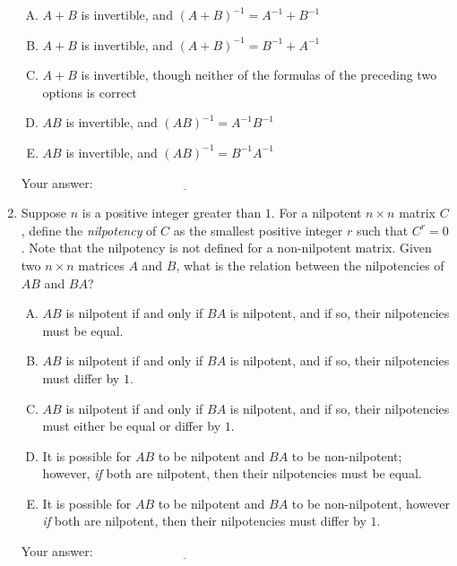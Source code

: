 \documentclass[10pt]{amsart}
\begin{document}
\begin{enumerate}
  \begin{enumerate}[(A)]
  \item $A + B$ is invertible, and $(A + B)^{-1} = A^{-1} + B^{-1}$
  \item $A + B$ is invertible, and $(A + B)^{-1} = B^{-1} + A^{-1}$
  \item $A + B$ is invertible, though neither of the formulas of the
    preceding two options is correct
  \item $AB$ is invertible, and $(AB)^{-1} = A^{-1}B^{-1}$
  \item $AB$ is invertible, and $(AB)^{-1} = B^{-1}A^{-1}$
  \end{enumerate}

  \vspace{0.1in}
  Your answer: $\underline{\qquad\qquad\qquad\qquad\qquad\qquad\qquad}$
  \vspace{0.1in}

\item Suppose $n$ is a positive integer greater than $1$. For a
  nilpotent $n \times n$ matrix $C$, define the {\em nilpotency} of
  $C$ as the smallest positive integer $r$ such that $C^r = 0$. Note
  that the nilpotency is not defined for a non-nilpotent matrix. Given
  two $n \times n$ matrices $A$ and $B$, what is the relation between
  the nilpotencies of $AB$ and $BA$?

  \begin{enumerate}[(A)]
  \item $AB$ is nilpotent if and only if $BA$ is nilpotent, and if
    so, their nilpotencies must be equal.
  \item $AB$ is nilpotent if and only if $BA$ is nilpotent, and if so,
    their nilpotencies must differ by $1$.
  \item $AB$ is nilpotent if and only if $BA$ is nilpotent, and if so,
    their nilpotencies must either be equal or differ by $1$.
  \item It is possible for $AB$ to be nilpotent and $BA$ to be
    non-nilpotent; however, {\em if} both are nilpotent, then their
    nilpotencies must be equal.
  \item It is possible for $AB$ to be nilpotent and $BA$ to be
    non-nilpotent, however {\em if} both are nilpotent, then their
    nilpotencies must differ by $1$.
  \end{enumerate}

  \vspace{0.1in}
  Your answer: $\underline{\qquad\qquad\qquad\qquad\qquad\qquad\qquad}$
  \vspace{0.1in}


\end{enumerate}
\end{document}
